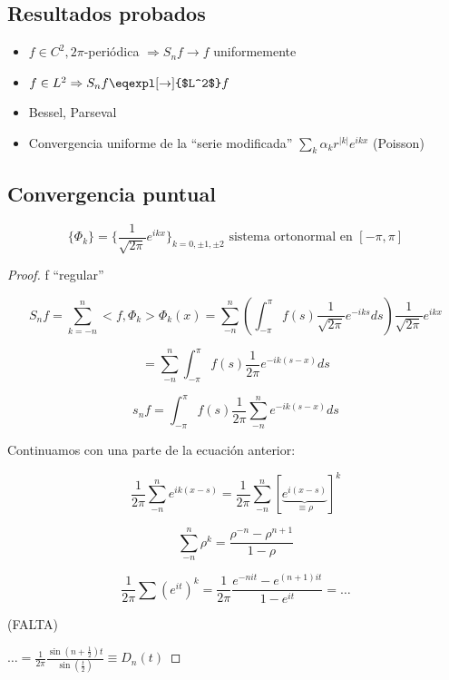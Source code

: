 	\subsection{Resultados probados}


		\begin{itemize}

			\item $f \in C^2, 2\pi$-periódica $\Rightarrow S_n f \rightarrow f$ uniformemente

			\item $f\in L^2 \Rightarrow S_n f \eqexpl[\rightarrow]{$L^2$} f$

			\item Bessel, Parseval

			\item Convergencia uniforme de la ``serie modificada'' $\sum\limits_k \alpha_k r^{|k|} e^{ikx}$ (Poisson)

		\end{itemize}


	\subsection{Convergencia puntual}

	\begin{theorem}

		\[ \{\Phi_k\} = \{\frac{1}{\sqrt{2\pi}} e^{ikx}\}_{k=0, ±1,±2}  \text{ sistema ortonormal en } [-\pi,\pi]\]



	\end{theorem}

	\begin{proof}

		f ``regular''

		\[S_nf = \sum_{k=-n}^{n} <f,\Phi_k> \Phi_k(x) = \sum_{-n}^n \left( \int_{-\pi}^\pi f(s) \frac{1}{\sqrt{2\pi}} e^{-iks} ds \right)  \frac{1}{\sqrt{2\pi}} e^{ikx} \]

		\[ = \sum_{-n}^{n}  \int_{-\pi}^\pi f(s) \frac{1}{2\pi} e^{-ik(s-x)} ds  \]


		\[ s_n f = \int_{-\pi}^{\pi} f(s) \frac{1}{2\pi} \sum_{-n}^n e^{-ik(s-x)} ds \]

		Continuamos con una parte de la ecuación anterior:

		\[ \frac{1}{2\pi} \sum_{-n}^n e^{ik(x-s)} = \frac{1}{2\pi} \sum_{-n}^n \left[\underbrace{e^{i(x-s)} }_{\equiv \rho}\right]^k \]

		\[ \sum_{-n}^n \rho^k = \frac{\rho^{-n} - \rho^{n+1}}{1 -\rho} \]

		\[ \frac{1}{2\pi}  \sum(e^{it})^k = \frac{1}{2\pi} \frac{e^{-nit}-e^{(n+1)it}}{1-e^{it}} = … \]

		(FALTA)

		\( … = \frac{1}{2\pi} \frac{\sin(n+ \frac{1}{2})t}{\sin(\frac{t}{2})}  \equiv D_n(t) \label{eq:nucleoDirichlet}\)
	\end{proof}

